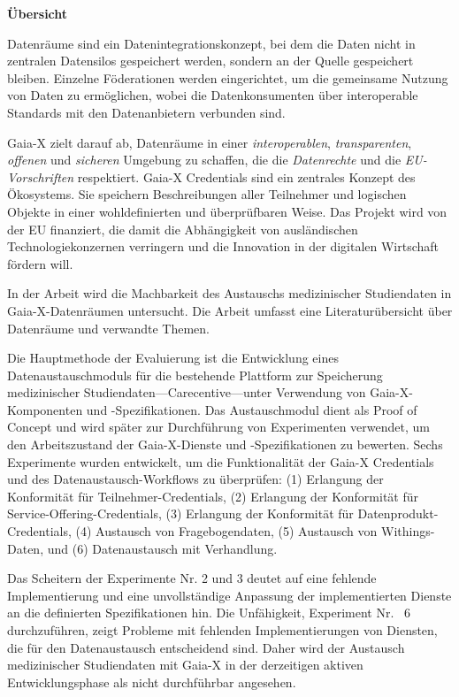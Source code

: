 \documentclass{maddoc}
\begin{document}
\begin{center}
\bfseries
Übersicht
\normalfont
\end{center}

Datenräume sind ein Datenintegrationskonzept, bei dem die Daten nicht in zentralen Datensilos gespeichert werden, sondern an der Quelle gespeichert bleiben.
Einzelne Föderationen werden eingerichtet, um die gemeinsame Nutzung von Daten zu ermöglichen, wobei die Datenkonsumenten über interoperable Standards mit den Datenanbietern verbunden sind.

Gaia-X zielt darauf ab, Datenräume in einer \textit{interoperablen}, \textit{transparenten}, \textit{offenen} und \textit{sicheren} Umgebung zu schaffen, die die \textit{Datenrechte} und die \textit{EU-Vorschriften} respektiert.
Gaia-X Credentials sind ein zentrales Konzept des Ökosystems.
Sie speichern Beschreibungen aller Teilnehmer und logischen Objekte in einer wohldefinierten und überprüfbaren Weise.
Das Projekt wird von der EU finanziert, die damit die Abhängigkeit von ausländischen Technologiekonzernen verringern und die Innovation in der digitalen Wirtschaft fördern will.

In der Arbeit wird die Machbarkeit des Austauschs medizinischer Studiendaten in Gaia-X-Datenräumen untersucht.
Die Arbeit umfasst eine Literaturübersicht über Datenräume und verwandte Themen.

Die Hauptmethode der Evaluierung ist die Entwicklung eines Datenaustauschmoduls für die bestehende Plattform zur Speicherung medizinischer Studiendaten---Carecentive---unter Verwendung von Gaia-X-Komponenten und -Spezifikationen.
Das Austauschmodul dient als Proof of Concept und wird später zur Durchführung von Experimenten verwendet, um den Arbeitszustand der Gaia-X-Dienste und -Spezifikationen zu bewerten.
Sechs Experimente wurden entwickelt, um die Funktionalität der Gaia-X Credentials und des Datenaustausch-Workflows zu überprüfen: (1) Erlangung der Konformität für Teilnehmer-Credentials, (2) Erlangung der Konformität für Service-Offering-Credentials, (3) Erlangung der Konformität für Datenprodukt-Credentials, (4) Austausch von Fragebogendaten, (5) Austausch von Withings-Daten, und (6) Datenaustausch mit Verhandlung.

Das Scheitern der Experimente Nr. 2 und 3 deutet auf eine fehlende Implementierung und eine unvollständige Anpassung der implementierten Dienste an die definierten Spezifikationen hin.
Die Unfähigkeit, Experiment Nr. ~6 durchzuführen, zeigt Probleme mit fehlenden Implementierungen von Diensten, die für den Datenaustausch entscheidend sind.
Daher wird der Austausch medizinischer Studiendaten mit Gaia-X in der derzeitigen aktiven Entwicklungsphase als nicht durchführbar angesehen.
\end{document}

